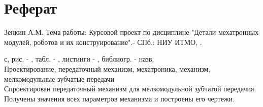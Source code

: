 \section*{\centering Реферат}

Зенкин А.М. Тема работы: Курсовой проект по дисциплине "Детали мехатронных модулей, роботов и их конструирование".- СПб.: НИУ ИТМО, \the\year. \begin{NoHyper}{\pageref{LastPage}}\end{NoHyper}  с, рис. - \totalfigures{}, табл. - \totaltables{}, листинги - , библиогр. -  назв.\\[1cm]

Проектирование, передаточный механизм, мехатроника, механизм, мелкомодульные зубчатые передачи\\

Спроектирован передаточный механизм для мелкомодульной зубчатой передачия. Получены значения всех параметров механизма и построены его чертежи.


\thispagestyle{empty} %
\newpage

